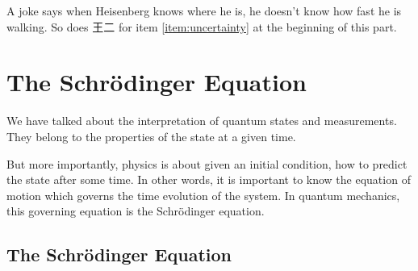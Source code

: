 A joke says when Heisenberg knows where he is, he doesn't know how fast he is walking. So does 王二 for item \ref{item:uncertainty} at the beginning of this part.


\section{The Schr{\"o}dinger Equation} \label{sec:schro-all}
We have talked about the interpretation of quantum states and measurements. They belong to the properties of the state at a given time.

But more importantly, physics is about given an initial condition, how to predict the state after some time. In other words, it is important to know the equation of motion which governs the time evolution of the system. In quantum mechanics, this governing equation is the Schr{\"o}dinger equation.

\needspace{0.2\textheight}
\subsection{The Schr{\"o}dinger Equation} \label{sec:Schrod}

